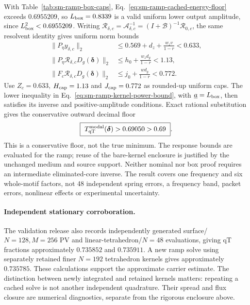 With Table~\ref{tab:sm-ramp-box-caps}, Eq.~\eqref{eq:sm-ramp-cached-energy-floor} exceeds $0.6955209$, so $L_{\rm box}=0.8339$ is a valid uniform lower output amplitude, since $L_{\rm box}^2<0.6955209$. Writing $\mathcal R_{\delta,c}=\mathcal A_{\delta,c}^{-1}=(I+\mathcal B)^{-1}\mathcal R_{0,c}$, the same resolvent identity gives uniform norm bounds
\begin{align}
 \|P_\eta y_{\delta,c}\|_2&\le0.569+d_z+\frac{w_zv}{1-r}<0.633,\nonumber\\
 \|P_\eta\mathcal R_{\delta,c}D_g(\bm\delta)\|_2&\le h_0+\frac{w_zd_g}{1-r}<1.13,\nonumber\\
 \|F_c\mathcal R_{\delta,c}D_g(\bm\delta)\|_2&\le j_0+\frac{wd_g}{1-r}<0.772.
 \label{eq:sm-ramp-uniform-kernel-caps}
\end{align}
Use $Z_c=0.633$, $H_{\rm cap}=1.13$ and $J_{\rm cap}=0.772$ as rounded-up uniform caps. The lower inequality in Eq.~\eqref{eq:sm-ramp-kernel-power-bound}, with $\underline a=L_{\rm box}$, then satisfies its inverse and positive-amplitude conditions. Exact rational substitution gives the conservative outward decimal floor
\begin{equation}
 \boxed{\ T_{\mathrm{qT}}^{\rm modal}(\bm\delta)>0.69050>0.69\ }.
 \label{eq:sm-ramp-whole-box-floor}
\end{equation}
This is a conservative floor, not the true minimum. The response bounds are evaluated for the ramp; reuse of the bare-kernel enclosure is justified by the unchanged medium and source support. Neither nominal nor box proof requires an intermediate eliminated-core inverse. The result covers one frequency and six whole-motif factors, not 48 independent spring errors, a frequency band, packet errors, nonlinear effects or experimental uncertainty.

\paragraph*{Independent stationary corroboration.}
The validation release also records independently generated surface/$N=128,M=256$ PV and linear-tetrahedron/$N=48$ evaluations, giving qT fractions approximately $0.735852$ and $0.735911$. A new ramp solve using separately retained finer $N=192$ tetrahedron kernels gives approximately $0.735785$. These calculations support the approximate carrier estimate. The distinction between newly integrated and retained kernels matters: repeating a cached solve is not another independent quadrature. Their spread and flux closure are numerical diagnostics, separate from the rigorous enclosure above.

